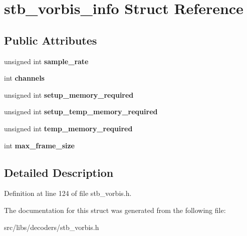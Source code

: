 \hypertarget{structstb__vorbis__info}{\section{stb\-\_\-vorbis\-\_\-info Struct Reference}
\label{structstb__vorbis__info}
}
\subsection*{Public Attributes}
\begin{DoxyCompactItemize}
\item 
\hypertarget{structstb__vorbis__info_a9ccd1991052734f88a4bd3743b749993}{unsigned int {\bfseries sample\-\_\-rate}}\label{structstb__vorbis__info_a9ccd1991052734f88a4bd3743b749993}

\item 
\hypertarget{structstb__vorbis__info_a074f6af8c99f6c583696d34bf4c7744a}{int {\bfseries channels}}\label{structstb__vorbis__info_a074f6af8c99f6c583696d34bf4c7744a}

\item 
\hypertarget{structstb__vorbis__info_a3dd3e567beb2bb9d7d62dcca83f301fb}{unsigned int {\bfseries setup\-\_\-memory\-\_\-required}}\label{structstb__vorbis__info_a3dd3e567beb2bb9d7d62dcca83f301fb}

\item 
\hypertarget{structstb__vorbis__info_aec05c013773be9d8d52f9bb784bdc084}{unsigned int {\bfseries setup\-\_\-temp\-\_\-memory\-\_\-required}}\label{structstb__vorbis__info_aec05c013773be9d8d52f9bb784bdc084}

\item 
\hypertarget{structstb__vorbis__info_a2fe235656197249fc3a6b5e27ff2da82}{unsigned int {\bfseries temp\-\_\-memory\-\_\-required}}\label{structstb__vorbis__info_a2fe235656197249fc3a6b5e27ff2da82}

\item 
\hypertarget{structstb__vorbis__info_ad07f41541db438dcdac6ca223c5876e9}{int {\bfseries max\-\_\-frame\-\_\-size}}\label{structstb__vorbis__info_ad07f41541db438dcdac6ca223c5876e9}

\end{DoxyCompactItemize}


\subsection{Detailed Description}


Definition at line 124 of file stb\-\_\-vorbis.\-h.



The documentation for this struct was generated from the following file\-:\begin{DoxyCompactItemize}
\item 
src/libs/decoders/stb\-\_\-vorbis.\-h\end{DoxyCompactItemize}
